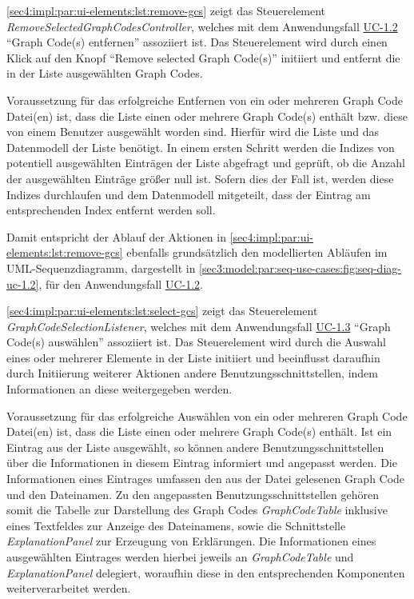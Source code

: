 \cref{sec4:impl:par:ui-elements:lst:remove-gcs} zeigt das Steuerelement \textit{RemoveSelectedGraphCodesController}, welches mit dem Anwendungsfall \hyperref[sec3:model:uc-1.2]{UC-1.2} \enquote{Graph Code(s) entfernen} assoziiert ist.
Das Steuerelement wird durch einen Klick auf den Knopf \enquote{Remove selected Graph Code(s)} initiiert und entfernt die in der Liste ausgewählten Graph Codes.



Voraussetzung für das erfolgreiche Entfernen von ein oder mehreren Graph Code Datei(en) ist, dass die Liste einen oder mehrere Graph Code(s) enthält bzw. diese von einem Benutzer ausgewählt worden sind.
Hierfür wird die Liste und das Datenmodell der Liste benötigt.
In einem ersten Schritt werden die Indizes von potentiell ausgewählten Einträgen der Liste abgefragt und geprüft, ob die Anzahl der ausgewählten Einträge größer null ist.
Sofern dies der Fall ist, werden diese Indizes durchlaufen und dem Datenmodell mitgeteilt, dass der Eintrag am entsprechenden Index entfernt werden soll.

Damit entspricht der Ablauf der Aktionen in \cref{sec4:impl:par:ui-elements:lst:remove-gcs} ebenfalls grundsätzlich den modellierten Abläufen im UML-Sequenzdiagramm, dargestellt in \cref{sec3:model:par:seq-use-cases:fig:seq-diag-uc-1.2}, für den Anwendungsfall \hyperref[sec3:model:uc-1.2]{UC-1.2}.

\cref{sec4:impl:par:ui-elements:lst:select-gcs} zeigt das Steuerelement \textit{GraphCodeSelectionListener}, welches mit dem Anwendungsfall \hyperref[sec3:model:uc-1.3]{UC-1.3} \enquote{Graph Code(s) auswählen} assoziiert ist.
Das Steuerelement wird durch die Auswahl eines oder mehrerer Elemente in der Liste initiiert und beeinflusst daraufhin durch Initiierung weiterer Aktionen andere Benutzungsschnittstellen, indem Informationen an diese weitergegeben werden.



Voraussetzung für das erfolgreiche Auswählen von ein oder mehreren Graph Code Datei(en) ist, dass die Liste einen oder mehrere Graph Code(s) enthält.
Ist ein Eintrag aus der Liste ausgewählt, so können andere Benutzungsschnittstellen über die Informationen in diesem Eintrag informiert und angepasst werden.
Die Informationen eines Eintrages umfassen den aus der Datei gelesenen Graph Code und den Dateinamen.
Zu den angepassten Benutzungsschnittstellen gehören somit die Tabelle zur Darstellung des Graph Codes \textit{GraphCodeTable} inklusive eines Textfeldes zur Anzeige des Dateinamens, sowie die Schnittstelle \textit{ExplanationPanel} zur Erzeugung von Erklärungen.
Die Informationen eines ausgewählten Eintrages werden hierbei jeweils an \textit{GraphCodeTable} und \textit{ExplanationPanel} delegiert, woraufhin diese in den entsprechenden Komponenten weiterverarbeitet werden.

